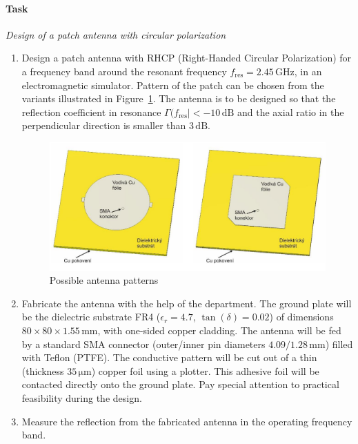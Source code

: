 \documentclass[11pt,a4paper]{article}
\begin{document}
    \paragraph{Task} \emph{Design of a patch antenna with circular polarization}
    \begin{enumerate}[label=\arabic*.]
        \item Design a patch antenna with RHCP (Right-Handed Circular Polarization) for a frequency band around the resonant frequency $f_{\mathrm{res}} = 2.45\, \mathrm{GHz}$, in an electromagnetic simulator. Pattern of the patch can be chosen from the variants illustrated in Figure~\ref{fig:antenna-patterns}. The antenna is to be designed so that the reflection coefficient in resonance $\Gamma(f_{\mathrm{res}}| < -10\, \mathrm{dB}$ and the axial ratio in the perpendicular direction is smaller than $3\, \mathrm{dB}$.
        \begin{figure}[!ht]
            \centering
            \includegraphics[width=.7\textwidth]{src/antenna-patterns.png}
            \caption{\label{fig:antenna-patterns}Possible antenna patterns}
        \end{figure}

        \item Fabricate the antenna with the help of the department. The ground plate will be the dielectric substrate FR4 ($\epsilon_r = 4.7$, $\tan(\delta) = 0.02$) of dimensions $80 \times 80 \times 1.55\, \mathrm{mm}$, with one-sided copper cladding. The antenna will be fed by a standard SMA connector (outer/inner pin diameters $4.09/1.28\, \mathrm{mm}$) filled with Teflon (PTFE). The conductive pattern will be cut out of a thin (thickness $35\, \mathrm{\mu m}$) copper foil using a plotter. This adhesive foil will be contacted directly onto the ground plate. Pay special attention to practical feasibility during the design.

        \item Measure the reflection from the fabricated antenna in the operating frequency band.
        

\end{enumerate}
\end{document}
